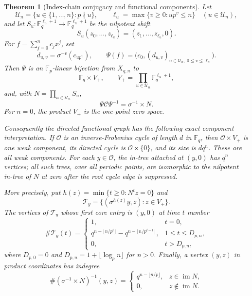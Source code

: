 \documentclass[10pt,a4paper]{amsart}
\newtheorem{theorem}{Theorem}[section]
\theoremstyle{definition}
\theoremstyle{remark}
\newcommand{\F}{\mathbb F}
\newcommand{\im}{\operatorname{im}}
\begin{document}
\begin{theorem}[Index-chain conjugacy and functional components]
\label{thm:conjugacy}
Let
\[
 \mathcal U_n=\{u\in\{1,\ldots,n\}:p\nmid u\},
 \qquad
 \ell_u=\max\{v\ge0:up^v\le n\}\quad(u\in\mathcal U_n),
\]
and let $S_u:\F_q^{\ell_u+1}\to\F_q^{\ell_u+1}$ be the
nilpotent shift
\[
 S_u(z_0,\ldots,z_{\ell_u})=(z_1,\ldots,z_{\ell_u},0).
\]
For $f=\sum_{j=0}^n c_jx^j$, set
\begin{equation}
 d_{u,v}=\sigma^{-v}(c_{up^v}),
 \qquad
 \Psi(f)=\bigl(c_0,(d_{u,v})_{u\in\mathcal U_n,\ 0\le v\le\ell_u}\bigr).
 \label{eq:chain-coordinates}
\end{equation}
Then $\Psi$ is an $\F_p$-linear bijection from $X_{q,n}$ to
\[
 \F_q\times V_+,
 \qquad
 V_+=\prod_{u\in\mathcal U_n}\F_q^{\ell_u+1},
\]
and, with $N=\prod_{u\in\mathcal U_n}S_u$,
\begin{equation}
 \boxed{\quad
 \Psi\mathcal C\Psi^{-1}=\sigma^{-1}\times N.
 \quad}
 \label{eq:product-conjugacy}
\end{equation}
For $n=0$, the product $V_+$ is the one-point zero space.

Consequently the directed functional graph has the following exact
component interpretation.  If $\mathcal O$ is an inverse-Frobenius cycle of
length $d$ in $\F_q$, then $\mathcal O\times V_+$ is one weak component,
its directed cycle is $\mathcal O\times\{0\}$, and its size is $dq^n$.
These are all weak components.  For each $y\in\mathcal O$, the in-tree
attached at $(y,0)$ has $q^n$ vertices; all such trees, over all periodic
points, are isomorphic to the nilpotent in-tree of $N$ at zero after the
root cycle edge is suppressed.

More precisely, put $h(z)=\min\{t\ge0:N^tz=0\}$ and
\[
 \mathcal T_y=\{(\sigma^{h(z)}y,z):z\in V_+\}.
\]
The vertices of $\mathcal T_y$ whose first core entry is $(y,0)$ at time
$t$ number
\begin{equation}
 \#\mathcal T_y(t)=
 \begin{cases}
 1,&t=0,\\
 q^{n-\lfloor n/p^t\rfloor}
  -q^{n-\lfloor n/p^{t-1}\rfloor},&1\le t\le D_{p,n},\\
 0,&t>D_{p,n},
 \end{cases}
 \label{eq:component-layers}
\end{equation}
where $D_{p,0}=0$ and $D_{p,n}=1+\lfloor\log_p n\rfloor$ for $n>0$.
Finally, a vertex $(y,z)$ in product coordinates has indegree
\begin{equation}
 \#(\sigma^{-1}\times N)^{-1}(y,z)=
 \begin{cases}
 q^{n-\lfloor n/p\rfloor},&z\in\im N,\\
 0,&z\notin\im N.
 \end{cases}
 \label{eq:component-indegree}
\end{equation}
\end{theorem}
\end{document}
